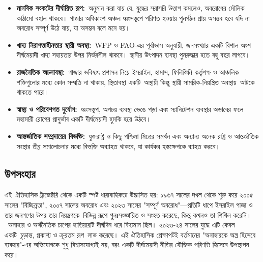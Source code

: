 \begin{itemize}
\item
  \textbf{মানবিক সংকটের দীর্ঘায়িত রূপ:}~অনুমান করা যায় যে, যুদ্ধের সরাসরি
  উত্তাপ কমলেও, অবরোধের মৌলিক কাঠামো বহাল থাকবে। গাজার অধিকাংশ অঞ্চল
  ধ্বংসস্তূপে পরিণত হওয়ায় পুনর্গঠন প্রায় অসম্ভব হবে যদি না অবরোধ সম্পূর্ণ উঠে যায়,
  যা অসম্ভব বলে মনে হয়।
\item
  \textbf{খাদ্য নিরাপত্তাহীনতার স্থায়ী অবস্থা:}~WFP ও FAO-এর পূর্বাভাস অনুযায়ী,
  জনসংখ্যার একটি বিশাল অংশ দীর্ঘমেয়াদী খাদ্য সহায়তার উপর নির্ভরশীল থাকবে।
  স্থানীয় উৎপাদন ব্যবস্থা পুনরুদ্ধার হতে বহু বছর লাগবে।
\item
  \textbf{রাজনৈতিক অচলাবস্থা:}~গাজার ভবিষ্যৎ প্রশাসন নিয়ে ইসরাইল, হামাস,
  ফিলিস্তিনি কর্তৃপক্ষ ও আঞ্চলিক শক্তিগুলোর মধ্যে কোন সম্মতি না থাকায়, স্থিতাবস্থা
  একটি~অস্থায়ী কিন্তু স্থায়ী সামরিক-নিয়ন্ত্রিত অবস্থায়~আটকে থাকতে পারে।
\item
  \textbf{স্বাস্থ্য ও পরিবেশগত দুর্যোগ:}~ধ্বংসস্তূপ, অপচয় ব্যবস্থা ভেঙে পড়া এবং
  স্যানিটেশন ব্যবস্থার অভাবের ফলে মহামারী রোগের প্রাদুর্ভাব একটি দীর্ঘমেয়াদী
  হুমকি হয়ে উঠবে।
\item
  \textbf{আন্তর্জাতিক সম্প্রদায়ের বিভক্তি:}~যুক্তরাষ্ট্র ও কিছু পশ্চিমা মিত্রের
  সমর্থন এবং অন্যান্য অনেক রাষ্ট্র ও আন্তর্জাতিক সংস্থার তীব্র সমালোচনার মধ্যে
  বিভক্তি অব্যাহত থাকবে, যা কার্যকর হস্তক্ষেপকে ব্যাহত করবে।
\end{itemize}
\vspace{0.3em}

\subsection{\texorpdfstring{উপসংহার}{২.৮ উপসংহার }}\label{ux989ux9aaux9b8ux9b9ux9b0}

এই ঐতিহাসিক ট্রাজেক্টরি থেকে একটি স্পষ্ট ধারাবাহিকতা উদ্ভাসিত হয়: ১৯৬৭ সালের
দখল থেকে শুরু করে ২০০৫ সালের "বিচ্ছিন্নতা", ২০০৭ সালের অবরোধ এবং ২০২৩ সালের
"সম্পূর্ণ অবরোধ"---প্রতিটি ধাপে ইসরাইল গাজা ও তার জনগণের উপর তার
নিয়ন্ত্রণকে~বিভিন্ন রূপে পুনঃসংজ্ঞায়িত ও সংহত করেছে, কিন্তু কখনও তা শিথিল
করেনি।~অনাহার ও অর্থনৈতিক চাপের হাতিয়ারটি দীর্ঘদিন ধরে বিদ্যমান ছিল।
২০২৩-২৪ সালের যুদ্ধে এটি কেবল একটি~চূড়ান্ত, প্রকাশ্য ও ক্রূরতম রূপ~লাভ করেছে। এই
ঐতিহাসিক প্রেক্ষাপটই বর্তমানের "অনাহারকে অস্ত্র হিসেবে ব্যবহার"-এর অভিযোগকে শুধু
বিশ্বাসযোগ্যই নয়, বরং একটি দীর্ঘমেয়াদী নীতির যৌক্তিক পরিণতি হিসেবে উপস্থাপন
করে।

